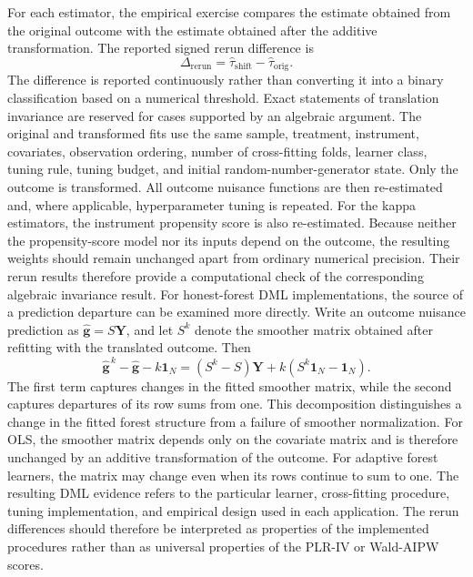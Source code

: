 \documentclass[12pt, a4paper, oneside]{article}
\theoremstyle{plain}
\theoremstyle{definition}
\begin{document}
For each estimator, the empirical exercise compares the estimate obtained
from the original outcome with the estimate obtained after the additive
transformation. 
The reported signed rerun difference is
\begin{equation}
    \Delta_{\mathrm{rerun}}
    =
    \widehat{\tau}_{\mathrm{shift}}
    -
    \widehat{\tau}_{\mathrm{orig}}.
    \label{eq:complete_pipeline_rerun}
\end{equation}
The difference is reported continuously rather than converting it
into a binary classification based on a numerical threshold. Exact statements
of translation invariance are reserved for cases supported by an algebraic
argument. 
The original and transformed fits use the same sample, treatment, instrument,
covariates, observation ordering, number of cross-fitting folds, learner
class, tuning rule, tuning budget, and initial random-number-generator state.
 Only the outcome is transformed. All outcome nuisance functions are
then re-estimated and, where applicable, hyperparameter tuning is repeated.
For the kappa estimators, the instrument propensity score is also re-estimated.
Because neither the propensity-score model nor its inputs depend on the
outcome, the resulting weights should remain unchanged apart from ordinary
numerical precision. Their rerun results therefore provide a computational
check of the corresponding algebraic invariance result.
For honest-forest DML implementations, the source of a prediction departure
can be examined more directly. Write an outcome nuisance prediction as
\(\widehat{\mathbf g}=S\mathbf Y\), and let \(S^k\) denote the smoother
matrix obtained after refitting with the translated outcome. Then
\begin{equation}
    \widehat{\mathbf g}^{\,k}
    -
    \widehat{\mathbf g}
    -
    k\mathbf 1_N
    =
    (S^k-S)\mathbf Y
    +
    k(S^k\mathbf 1_N-\mathbf 1_N).
    \label{eq:smoother_translation_decomposition}
\end{equation}
The first term captures changes in the fitted smoother matrix, while the
second captures departures of its row sums from one. This decomposition
distinguishes a change in the fitted forest structure from a failure of
smoother normalization. For OLS, the smoother matrix depends only on the
covariate matrix and is therefore unchanged by an additive transformation of
the outcome. For adaptive forest learners, the matrix may change even when
its rows continue to sum to one.
The resulting DML evidence refers to the particular learner,
cross-fitting procedure, tuning implementation, and empirical design used in
each application. The rerun differences should therefore be interpreted as
properties of the implemented procedures rather than as universal properties
of the PLR-IV or Wald-AIPW scores.
\end{document}
